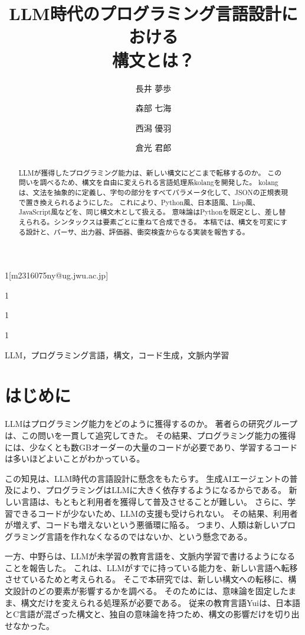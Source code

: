 \documentclass{ipsjprosym}
\begin{document}
\title{LLM時代のプログラミング言語設計における\\構文とは？}


\author{長井 夢歩}{}{1}[m2316075ny@ug.jwu.ac.jp]
\author{森部 七海}{}{1}
\author{西潟 優羽}{}{1}
\author{倉光 君郎}{}{1}

\begin{abstract}
LLMが獲得したプログラミング能力は、新しい構文にどこまで転移するのか。
この問いを調べるため、構文を自由に変えられる言語処理系kolangを開発した。
kolangは、文法を抽象的に定義し、字句の部分をすべてパラメータ化して、JSONの正規表現で置き換えられるようにした。
これにより、Python風、日本語風、Lisp風、JavaScript風などを、同じ構文木として扱える。
意味論はPythonを既定とし、差し替えられる。シンタックスは要素ごとに重ねて合成できる。
本稿では、構文を可変にする設計と、パーサ、出力器、評価器、衝突検査からなる実装を報告する。
\end{abstract}

\begin{jkeyword}
LLM，プログラミング言語，構文，コード生成，文脈内学習
\end{jkeyword}

\maketitle

\section{はじめに}

LLMはプログラミング能力をどのように獲得するのか。
著者らの研究グループは、この問いを一貫して追究してきた。
その結果、プログラミング能力の獲得には、少なくとも数GBオーダーの大量のコードが必要であり\cite{Souma2025Dataset}、学習するコードは多いほどよいことがわかっている\cite{Kaplan2020Scaling}。

この知見は、LLM時代の言語設計に懸念をもたらす。
生成AIエージェントの普及により、プログラミングはLLMに大きく依存するようになるからである。
新しい言語は、もともと利用者を獲得して普及させることが難しい。
さらに、学習できるコードが少ないため、LLMの支援も受けられない。
その結果、利用者が増えず、コードも増えないという悪循環に陥る。
つまり、人類は新しいプログラミング言語を作れなくなるのではないか、という懸念である。

一方、中野ら\cite{Kuramitsu2026Nanako,Nakano2026ProSym}は、LLMが未学習の教育言語を、文脈内学習で書けるようになることを報告した。
これは、LLMがすでに持っている能力を、新しい言語へ転移させているためと考えられる。
そこで本研究では、新しい構文への転移に、構文設計のどの要素が影響するかを調べる。
そのためには、意味論を固定したまま、構文だけを変えられる処理系が必要である。
従来の教育言語Yuiは、日本語とC言語が混ざった構文と、独自の意味論を持つため、構文の影響だけを切り出せなかった。
\end{document}
